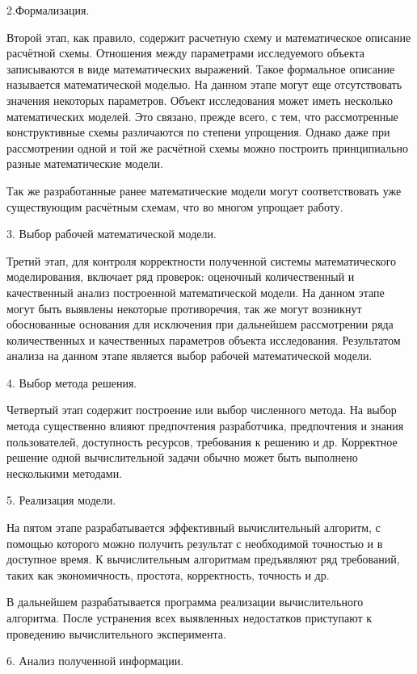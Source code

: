 2.Формализация.


Второй этап, как правило, содержит расчетную схему и математическое описание расчётной схемы. Отношения между параметрами исследуемого объекта записываются в виде математических выражений. Такое формальное описание называется математической моделью. На данном этапе могут еще отсутствовать значения некоторых параметров. 
Объект исследования может иметь несколько математических моделей. Это связано, прежде всего, с тем, что рассмотренные конструктивные схемы различаются по степени упрощения. Однако даже при рассмотрении одной и той же расчётной схемы можно построить принципиально разные математические модели. \cite{b3}


Так же разработанные ранее математические модели могут соответствовать уже существующим расчётным схемам, что во многом упрощает работу.


3.	Выбор рабочей математической модели.


Третий этап, для контроля корректности полученной системы математического моделирования, включает ряд проверок: оценочный количественный и качественный анализ построенной математической модели. На данном этапе могут быть выявлены некоторые противоречия, так же могут возникнут обоснованные основания для исключения при дальнейшем рассмотрении ряда количественных и качественных параметров объекта исследования. Результатом анализа на данном этапе является выбор рабочей математической модели.


4. Выбор метода решения.


Четвертый этап содержит построение или выбор численного метода. На выбор метода существенно влияют предпочтения разработчика, предпочтения и знания пользователей, доступность ресурсов, требования к решению и др. Корректное решение одной вычислительной задачи обычно может быть выполнено несколькими методами.


5. Реализация модели.


На пятом этапе разрабатывается эффективный вычислительный алгоритм, с помощью которого можно получить результат с необходимой точностью и в доступное время. К вычислительным алгоритмам предъявляют ряд требований, таких как экономичность, простота, корректность, точность и др. \cite{b4}


В дальнейшем разрабатывается программа реализации вычислительного алгоритма. После устранения всех выявленных недостатков приступают к проведению вычислительного эксперимента.


6. Анализ полученной информации.


